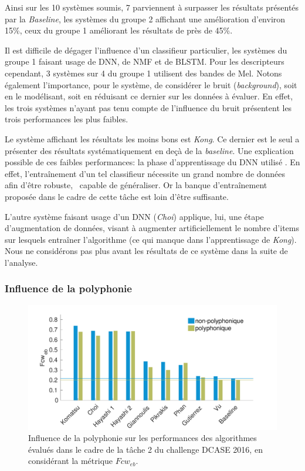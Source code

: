 Ainsi sur les 10 systèmes soumis, 7 parviennent à surpasser les résultats présentés par la \emph{Baseline}, les systèmes du groupe 2 affichant une amélioration d'environ 15\%, ceux du groupe 1 améliorant les résultats de près de 45\%.

Il est difficile de dégager l'influence d'un classifieur particulier, les systèmes du groupe 1 faisant usage de DNN, de NMF et de BLSTM. Pour les descripteurs cependant, 3 systèmes sur 4 du groupe 1 utilisent des bandes de Mel. Notons également l'importance, pour le système, de considérer le bruit (\emph{background}), soit en le modélisant, soit en réduisant ce dernier sur les données à évaluer. En effet, les trois systèmes n'ayant pas tenu compte de l'influence du bruit présentent les trois performances les plus faibles.

Le système affichant les résultats les moins bons est \emph{Kong}. Ce dernier est le seul a présenter des résultats systématiquement en deçà de la \emph{baseline}. Une explication possible de ces faibles performances: la phase d'apprentissage du DNN utilisé \citep{Kong2016}. En effet, l’entraînement d'un tel classifieur nécessite un grand nombre de données afin d'être robuste, \ie~capable de généraliser. Or la banque d'entraînement proposée dans le cadre de cette tâche est loin d'être suffisante. 

L'autre système faisant usage d'un DNN (\emph{Choi}) applique, lui, une étape d'augmentation de données, visant à augmenter artificiellement le nombre d'items sur lesquels entraîner l'algorithme \citep{Choi2016} (ce qui manque dans l'apprentissage de \emph{Kong}). Nous ne considérons pas plus avant les résultats de ce système dans la suite de l'analyse.

\subsubsection{Influence de la polyphonie}

\begin{figure}[t]
\includegraphics[width=1\textwidth]{gfx/ch_7/results_overall_poly_eb_class_wise_average_F_7}
\caption{Influence de la polyphonie sur les performances des algorithmes évalués dans le cadre de la tâche 2 du challenge DCASE 2016, en considérant la métrique $Fcw_{eb}$.}
\label{fig:overall_poly_eb_class_wise_F}
\end{figure}

